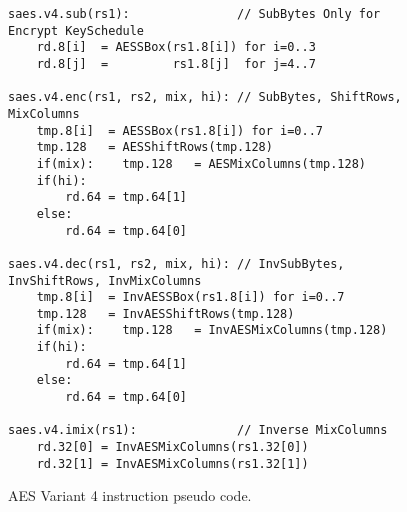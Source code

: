 \begin{figure}
\begin{lstlisting}
saes.v4.sub(rs1):               // SubBytes Only for Encrypt KeySchedule
    rd.8[i]  = AESSBox(rs1.8[i]) for i=0..3
    rd.8[j]  =         rs1.8[j]  for j=4..7

saes.v4.enc(rs1, rs2, mix, hi): // SubBytes, ShiftRows, MixColumns
    tmp.8[i]  = AESSBox(rs1.8[i]) for i=0..7
    tmp.128   = AESShiftRows(tmp.128)
    if(mix):    tmp.128   = AESMixColumns(tmp.128)
    if(hi):
        rd.64 = tmp.64[1]
    else:       
        rd.64 = tmp.64[0]

saes.v4.dec(rs1, rs2, mix, hi): // InvSubBytes, InvShiftRows, InvMixColumns
    tmp.8[i]  = InvAESSBox(rs1.8[i]) for i=0..7
    tmp.128   = InvAESShiftRows(tmp.128)
    if(mix):    tmp.128   = InvAESMixColumns(tmp.128)
    if(hi):
        rd.64 = tmp.64[1]
    else:
        rd.64 = tmp.64[0]

saes.v4.imix(rs1):              // Inverse MixColumns
    rd.32[0] = InvAESMixColumns(rs1.32[0])
    rd.32[1] = InvAESMixColumns(rs1.32[1])
\end{lstlisting}
\caption{AES Variant 4 instruction pseudo code.}
\label{fig:pesudo:aes:v4}
\end{figure}

